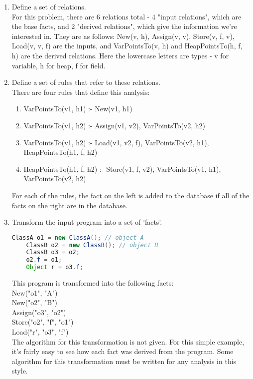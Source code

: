 \documentclass[acmlarge,anonymous]{acmart}\settopmatter{printfolios=true}
\begin{document}
\begin{enumerate}
    \item Define a set of relations.\\
    For this problem, there are 6 relations total - 4 "input relations", which are the base facts, and 2 "derived relations", which give the information we're interested in. They are as follows: New(v, h), Assign(v, v), Store(v, f, v), Load(v, v, f) are the inputs, and VarPointsTo(v, h) and HeapPointsTo(h, f, h) are the derived relations. Here the lowercase letters are types - v for variable, h for heap, f for field.
    
    \item Define a set of rules that refer to these relations.\\
    There are four rules that define this analysis:
    \begin{enumerate}
        \item VarPointsTo(v1, h1) :- New(v1, h1)
        \item VarPointsTo(v1, h2) :- Assign(v1, v2), VarPointsTo(v2, h2)
        \item VarPointsTo(v1, h2) :- Load(v1, v2, f), VarPointsTo(v2, h1), HeapPointsTo(h1, f, h2)
        \item HeapPointsTo(h1, f, h2) :- Store(v1, f, v2), VarPointsTo(v1, h1), VarPointsTo(v2, h2)
    \end{enumerate}
    For each of the rules, the fact on the left is added to the database if all of the facts on the right are in the database.\\
    
    \item Transform the input program into a set of 'facts'.
    \begin{lstlisting}[language=Java]
    ClassA o1 = new ClassA(); // object A
    ClassB o2 = new ClassB(); // object B
    ClassB o3 = o2;
    o2.f = o1;
    Object r = o3.f;
    \end{lstlisting}
    
    This program is transformed into the following facts:\\
    New("o1", "A")\\
    New("o2", "B")\\
    Assign("o3", "o2")\\
    Store("o2", "f", "o1")\\
    Load("r", "o3", "f")\\
    
    The algorithm for this transformation is not given. For this simple example, it's fairly easy to see how each fact was derived from the program. Some algorithm for this transformation must be written for any analysis in this style.\\
    

\end{enumerate}
\end{document}
